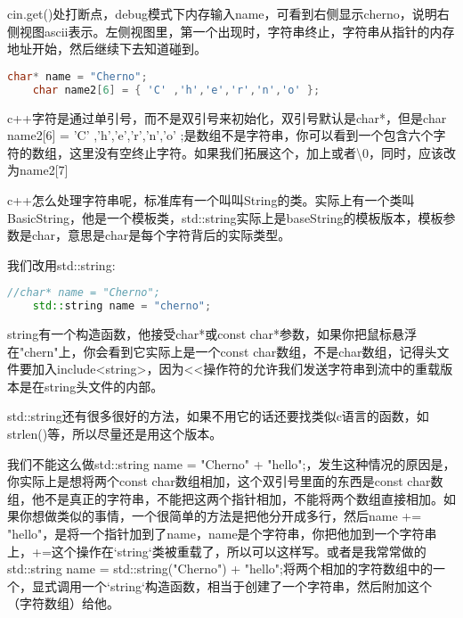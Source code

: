 {\ncodestyle cin.get()}处打断点，debug模式下内存输入{\ncodestyle name}，可看到右侧显示cherno，说明右侧视图ascii表示。左侧视图里，第一个{}出现时，字符串终止，字符串从指针的内存地址开始，然后继续下去知道碰到{}。


\begin{lstlisting}[language=c++]
    char* name = "Cherno";
    char name2[6] = { 'C' ,'h','e','r','n','o' };
\end{lstlisting}

c++字符是通过单引号，而不是双引号来初始化，双引号默认是{\ncodestyle char*}，但是{\ncodestyle char name2[6] = { 'C' ,'h','e','r','n','o' };}是数组不是字符串，你可以看到一个包含六个字符的数组，这里没有空终止字符。如果我们拓展这个，加上{}或者{\ncodestyle \textbackslash0}，同时，应该改为{\ncodestyle name2[7]}

c++怎么处理字符串呢，标准库有一个叫叫{\ncodestyle String}的类。实际上有一个类叫{\ncodestyle BasicString}，他是一个模板类，{\ncodestyle std::string}实际上是{\ncodestyle baseString}的模板版本，模板参数是{\ncodestyle char}，意思是{\ncodestyle char}是每个字符背后的实际类型。

我们改用{\ncodestyle std::string}:

\begin{lstlisting}[language=c++]
    //char* name = "Cherno";
    std::string name = "cherno";
\end{lstlisting}

{\ncodestyle string}有一个构造函数，他接受{\ncodestyle char*}或{\ncodestyle const char*}参数，如果你把鼠标悬浮在{\ncodestyle "chern"}上，你会看到它实际上是一个{\ncodestyle const char}数组，不是{\ncodestyle char}数组，记得头文件要加入{\ncodestyle include<string>}，因为{\ncodestyle <<}操作符的允许我们发送字符串到流中的重载版本是在{\ncodestyle string}头文件的内部。

{\ncodestyle std::string}还有很多很好的方法，如果不用它的话还要找类似c语言的函数，如{\ncodestyle strlen()}等，所以尽量还是用这个版本。

我们不能这么做{\ncodestyle std::string name = "Cherno" + "hello";}，发生这种情况的原因是，你实际上是想将两个{\ncodestyle const char}数组相加，这个双引号里面的东西是{\ncodestyle const char}数组，他不是真正的字符串，不能把这两个指针相加，不能将两个数组直接相加。如果你想做类似的事情，一个很简单的方法是把他分开成多行，然后{\ncodestyle name += "hello"}，是将一个指针加到了{\ncodestyle name}，{\ncodestyle name}是个字符串，你把他加到一个字符串上，{\ncodestyle +=}这个操作在`string`类被重载了，所以可以这样写。或者是我常常做的{\ncodestyle std::string name = std::string("Cherno") + "hello";}将两个相加的字符数组中的一个，显式调用一个`string`构造函数，相当于创建了一个字符串，然后附加这个（字符数组）给他。



